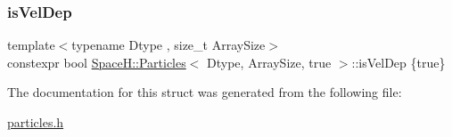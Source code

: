 \subsubsection{\texorpdfstring{is\+Vel\+Dep}{isVelDep}}
{\footnotesize\ttfamily template$<$typename Dtype , size\+\_\+t Array\+Size$>$ \\
constexpr bool \mbox{\hyperlink{struct_space_h_1_1_particles}{Space\+H\+::\+Particles}}$<$ Dtype, Array\+Size, true $>$\+::is\+Vel\+Dep \{true\}\hspace{0.3cm}{\ttfamily [static]}}



The documentation for this struct was generated from the following file\+:\begin{DoxyCompactItemize}
\item 
\mbox{\hyperlink{particles_8h}{particles.\+h}}\end{DoxyCompactItemize}
